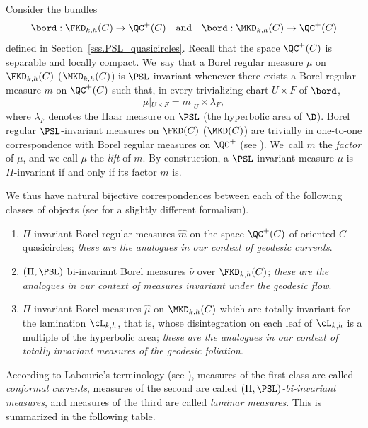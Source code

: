Consider the bundles
\[
\bord:\FKD_{k,h}(C)\to\QC^+(C)\quad\text{and}\quad \bord:\MKD_{k,h}(C)\to\QC^+(C)
\]
defined in Section~\ref{sss.PSL_quasicircles}. Recall that the space $\QC^+(C)$ is separable and locally compact. We~say that a Borel regular measure $\mu$ on $\FKD_{k,h}(C)$ (\resp $\MKD_{k,h}(C)$) is $\PSL$-invariant whenever there exists a Borel regular measure $m$ on $\QC^+(C)$ such that, in every trivializing chart $U\times F$ of $\bord$,
\begin{equation*}
\mu|_{U\times F}=m|_U\times\lambda_F,
\end{equation*}
where $\lambda_F$ denotes the Haar measure on $\PSL$ (\resp the hyperbolic area of $\D$). Borel regular $\PSL$-invariant measures on $\FKD(C)$ (\resp $\MKD(C)$) are trivially in one-to-one correspondence with Borel regular measures on $\QC^+$ (see \cite[Lem.\,4.2.1]{ALS}). We~call $m$ the \emph{factor} of $\mu$, and we call $\mu$ the \emph{lift} of $m$. By construction, a $\PSL$-invariant measure $\mu$ is $\Pi$-invariant if and only if its factor $m$ is.

We thus have natural bijective correspondences between each of the following classes of objects (see \cite[\S 4.2]{ALS} for a slightly different formalism).
\begin{enumerate}
\item $\Pi$-invariant Borel regular measures $\hat m$ on the space $\QC^+(C)$ of oriented $C$\nobreakdash-quasicircles; \emph{these are the analogues in our context of geodesic currents}.
\item $(\Pi,\PSL)$ bi-invariant Borel measures $\hat\nu$ over $\FKD_{k,h}(C)$; \emph{these are the analogues in our context of measures invariant under the geodesic flow}.
\item $\Pi$-invariant Borel measures $\hat\mu$ on $\MKD_{k,h}(C)$ which are totally invariant for the lamination $\cL_{k,h}$, that is, whose disintegration on each leaf of $\cL_{k,h}$ is a multiple of the hyperbolic area; \emph{these are the analogues in our context of totally invariant measures of the geodesic foliation}.
\end{enumerate}

According to Labourie's terminology (see \cite{LabourieBourbaki,MN_currents}), measures of the first class are called \emph{conformal currents}, measures of the second are called \emph{$(\Pi,\PSL)$-bi-invariant measures}, and measures of the third are called \emph{laminar measures}. This is summarized in the following table.

